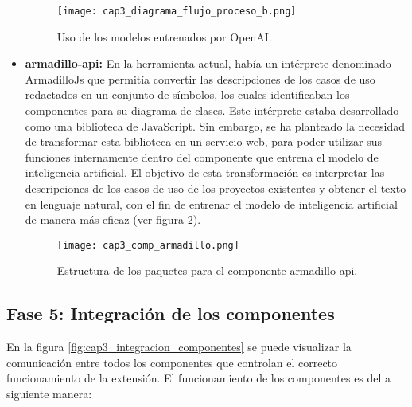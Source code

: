 \begin{itemize}
	\begin{figure}[H]  
		\centering
		\texttt{[image: cap3\_diagrama\_flujo\_proceso\_b.png]}
		\caption{Uso de los modelos entrenados por OpenAI.}
		\label{fig:cap3_diagrama_flujo_proceso_b}
	\end{figure}
	
	\item \textbf{armadillo-api: } En la herramienta actual, había un intérprete denominado ArmadilloJs que permitía convertir las descripciones de los casos de uso redactados en un conjunto de símbolos, los cuales identificaban los componentes para su diagrama de clases. Este intérprete estaba desarrollado como una biblioteca de JavaScript. Sin embargo, se ha planteado la necesidad de transformar esta biblioteca en un servicio web, para poder utilizar sus funciones internamente dentro del componente que entrena el modelo de inteligencia artificial. El objetivo de esta transformación es interpretar las descripciones de los casos de uso de los proyectos existentes y obtener el texto en lenguaje natural, con el fin de entrenar el modelo de inteligencia artificial de manera más eficaz (ver figura \ref{fig:cap3_comp_armadillo}). 
	
	\begin{figure}[H]  
		\centering
		\texttt{[image: cap3\_comp\_armadillo.png]}
		\caption{Estructura de los paquetes para el componente armadillo-api.}
		\label{fig:cap3_comp_armadillo}
	\end{figure}
	
\end{itemize}

\subsection{Fase 5: Integración de los componentes}

En la figura \ref{fig:cap3_integracion_componentes} se puede visualizar la comunicación entre todos los componentes que controlan el correcto funcionamiento de la extensión. El funcionamiento de los componentes es del a siguiente manera:

